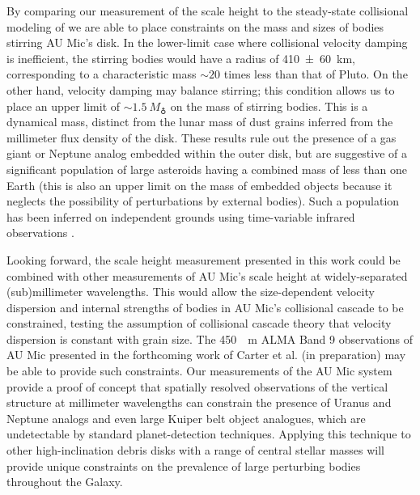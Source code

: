 \documentclass[modern]{aastex62}
\begin{document}
By comparing our measurement of the scale height to the steady-state collisional modeling of \citet{pan&schlichting12} we are able to place constraints on the mass
and 
sizes 
of bodies stirring AU Mic's disk.
In the lower-limit case where collisional velocity damping is inefficient, the stirring bodies would have a radius of \SI{410 \pm 60}{km}, corresponding to a characteristic mass $\sim 20$ times less than that of Pluto.
On the other hand, velocity damping may balance stirring; this condition allows us to place an upper limit of $\sim \SI{1.5}{M_\earth}$ on the mass of stirring bodies.
This is a dynamical mass, distinct from the lunar mass of dust grains inferred from the millimeter flux density of the disk.
These results rule out the presence of a gas giant or Neptune analog embedded 
within the outer disk, but are suggestive of a significant population of large asteroids having a combined mass of less than one Earth (this is also an upper limit on the mass
of embedded objects because it neglects the possibility of perturbations
by external bodies). Such a 
population has been inferred on independent grounds using time-variable infrared observations \citep{chiang&fung17}.

Looking forward, the scale height measurement presented in this work could be combined with other measurements of AU Mic's scale height at widely-separated (sub)millimeter wavelengths.
This would allow the size-dependent velocity dispersion and internal strengths of bodies in AU Mic's collisional cascade to be constrained, testing the assumption of collisional cascade theory that velocity dispersion is constant with grain size.
The \SI{450}{\mu m} ALMA Band 9 observations of AU Mic presented in the forthcoming work of Carter et al. (in preparation) may be able to provide such constraints.
Our measurements of the AU Mic system provide a proof of concept that spatially resolved observations of the vertical structure at millimeter wavelengths can constrain the presence of Uranus and Neptune analogs and even large Kuiper belt object analogues, which are undetectable by standard planet-detection techniques.  
Applying this technique to other high-inclination debris disks with a range of central stellar masses will provide unique constraints on the prevalence of large perturbing bodies throughout the Galaxy.
\end{document}
